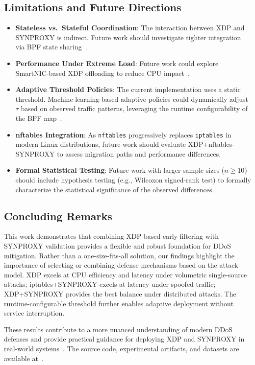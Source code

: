 \documentclass[conference]{IEEEtran}
\begin{document}
\subsection{Limitations and Future Directions}

\begin{itemize}

  \item \textbf{Stateless vs.\ Stateful Coordination}:
  The interaction between XDP and SYNPROXY is indirect.
  Future work should investigate tighter integration via BPF state
  sharing~\cite{bpf_sk_assign_tcp_reqsk}.

  \item \textbf{Performance Under Extreme Load}:
  Future work could explore SmartNIC-based XDP offloading to reduce CPU
  impact~\cite{XDPmode}.

  \item \textbf{Adaptive Threshold Policies}:
  The current implementation uses a static threshold.
  Machine learning-based adaptive policies could dynamically adjust $\tau$
  based on observed traffic patterns, leveraging the runtime configurability
  of the BPF map~\cite{CNN_ddos,dimolianis2022,sidoretti2023}.

  \item \textbf{nftables Integration}:
  As \texttt{nftables} progressively replaces \texttt{iptables} in modern
  Linux distributions, future work should evaluate XDP+nftables-SYNPROXY
  to assess migration paths and performance differences.

  \item \textbf{Formal Statistical Testing}:
  Future work with larger sample sizes ($n \geq 10$) should include
  hypothesis testing (e.g., Wilcoxon signed-rank test) to formally
  characterize the statistical significance of the observed differences.

\end{itemize}

\subsection{Concluding Remarks}

This work demonstrates that combining XDP-based early filtering with
SYNPROXY validation provides a flexible and robust foundation for DDoS
mitigation.
Rather than a one-size-fits-all solution, our findings highlight the
importance of selecting or combining defense mechanisms based on the
attack model.
XDP excels at CPU efficiency and latency under volumetric single-source
attacks; iptables+SYNPROXY excels at latency under spoofed traffic;
XDP+SYNPROXY provides the best balance under distributed attacks.
The runtime-configurable threshold further enables adaptive deployment
without service interruption.

These results contribute to a more nuanced understanding of modern DDoS
defenses and provide practical guidance for deploying XDP and SYNPROXY
in real-world systems~\cite{NetfilterArch,LinuxKernelDoc}.
The source code, experimental artifacts, and datasets are available
at~\cite{GitHubRepo}.



\end{document}
